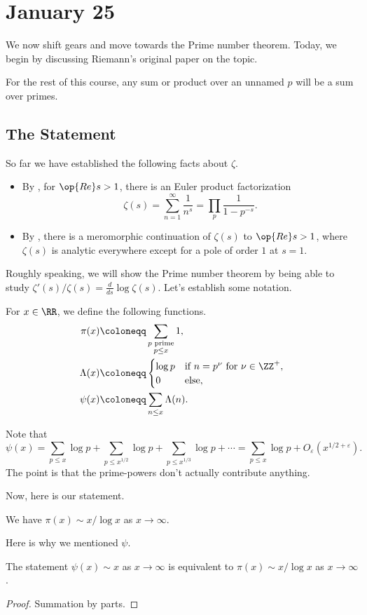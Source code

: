 \documentclass[../notes.tex]{subfiles}
\begin{document}
\section{January 25}

We now shift gears and move towards the Prime number theorem. Today, we begin by discussing Riemann's original paper on the topic.
\begin{remark}
	For the rest of this course, any sum or product over an unnamed $p$ will be a sum over primes.
\end{remark}

\subsection{The Statement}
So far we have established the following facts about $\zeta$.
\begin{itemize}
	\item By , for $\op{Re}s>1$, there is an Euler product factorization
	\[\zeta(s)=\sum_{n=1}^\infty\frac1{n^s}=\prod_p\frac1{1-p^{-s}}.\]
	\item By , there is a meromorphic continuation of $\zeta(s)$ to $\op{Re}s>1$, where $\zeta(s)$ is analytic everywhere except for a pole of order $1$ at $s=1$.
\end{itemize}
Roughly speaking, we will show the Prime number theorem by being able to study $\zeta'(s)/\zeta(s)=\frac d{ds}\log\zeta(s)$. Let's establish some notation.
\begin{definition}
	For $x\in\RR$, we define the following functions.
	\begin{align*}
		\pi(x) &\coloneqq \sum_{\substack{p\text{ prime}\\p\le x}}1, \\
		\Lambda(x) &\coloneqq\begin{cases}
			\log p & \text{if }n=p^\nu\text{ for }\nu\in\ZZ^+, \\
			0 & \text{else},
		\end{cases} \\
		\psi(x) &\coloneqq \sum_{n\le x}\Lambda(n).
	\end{align*}
\end{definition}
\begin{remark}
	Note that
	\[\psi(x)=\sum_{p\le x}\log p+\sum_{p\le x^{1/2}}\log p+\sum_{p\le x^{1/3}}\log p+\cdots=\sum_{p\le x}\log p+O_\varepsilon\left(x^{1/2+\varepsilon}\right).\]
	The point is that the prime-powers don't actually contribute anything.
\end{remark}
Now, here is our statement.
\begin{theorem}
	We have $\pi(x)\sim x/\log x$ as $x\to\infty$.
\end{theorem}
Here is why we mentioned $\psi$.
\begin{proposition}
	The statement $\psi(x)\sim x$ as $x\to\infty$ is equivalent to $\pi(x)\sim x/\log x$ as $x\to\infty$.
\end{proposition}
\begin{proof}
	Summation by parts.
\end{proof}
\end{document}
